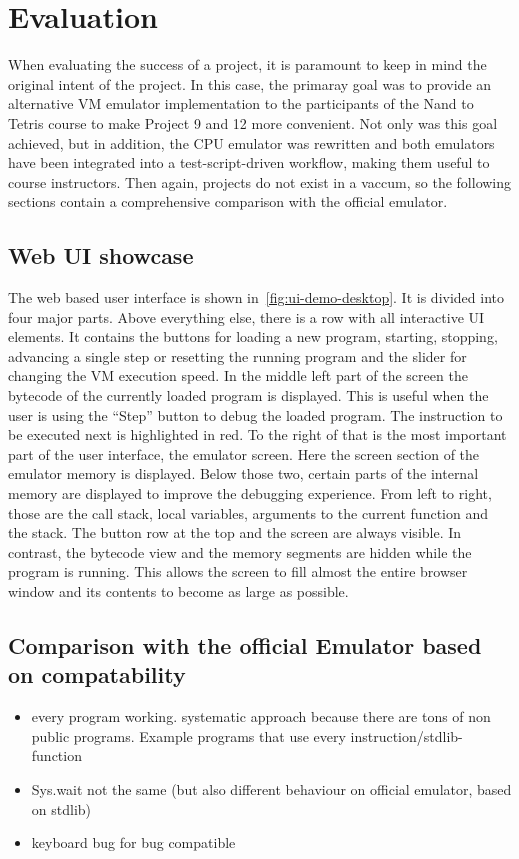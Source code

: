 \section{Evaluation} \label{evaluation}
When evaluating the success of a project, it is paramount to keep in mind the original intent of the project.
In this case, the primaray goal was to provide an alternative VM emulator implementation to the participants of the Nand to Tetris course to make Project 9 and 12 more convenient.
Not only was this goal achieved, but in addition, the CPU emulator was rewritten and both emulators have been integrated into a test-script-driven workflow, making them useful to course instructors.
Then again, projects do not exist in a vaccum, so the following sections contain a comprehensive comparison with the official emulator.

\subsection{Web UI showcase}
The web based user interface is shown in~\cref{fig:ui-demo-desktop}. It is divided into four major parts.
Above everything else, there is a row with all interactive UI elements. It contains the buttons for loading a new program, starting, stopping, advancing a single step or resetting the running program and the slider for changing the VM execution speed.
In the middle left part of the screen the bytecode of the currently loaded program is displayed. This is useful when the user is using the ``Step'' button to debug the loaded program. The instruction to be executed next is highlighted in red.
To the right of that is the most important part of the user interface, the emulator screen.
Here the screen section of the emulator memory is displayed.
Below those two, certain parts of the internal memory are displayed to improve the debugging experience. From left to right, those are the call stack, local variables, arguments to the current function and the stack.
The button row at the top and the screen are always visible.
In contrast, the bytecode view and the memory segments are hidden while the program is running. This allows the screen to fill almost the entire browser window and its contents to become as large as possible.


\subsection{Comparison with the official Emulator based on compatability} \label{compatibility}
\begin{itemize}
  \item every program working. systematic approach because there are tons of non public programs. Example programs that use every instruction/stdlib-function
  \item Sys.wait not the same (but also different behaviour on official emulator, based on stdlib)
  \item keyboard bug for bug compatible
\end{itemize}

